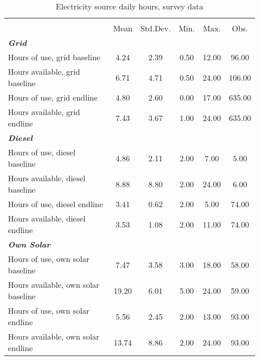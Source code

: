 \begin{table}[htbp]\centering
\def\sym#1{\ifmmode^{#1}\else\(^{#1}\)\fi}
\caption{Electricity source daily hours, survey data\label {tab1}}
\begin{tabular}{l*{1}{ccccc}}
\toprule
                    &\multicolumn{5}{c}{}                                            \\
                    &\multicolumn{1}{c}{{Mean}}&\multicolumn{1}{c}{{Std.Dev.}}&\multicolumn{1}{c}{{Min.}}&\multicolumn{1}{c}{{Max.}}&\multicolumn{1}{c}{{Obs.}}\\
\midrule
\textbf{\emph{Grid}}&            &            &            &            &            \\
Hours of use, grid baseline&        4.24&        2.39&        0.50&       12.00&       96.00\\
Hours available, grid baseline&        6.71&        4.71&        0.50&       24.00&      106.00\\
Hours of use, grid endline&        4.80&        2.60&        0.00&       17.00&      635.00\\
Hours available, grid endline&        7.43&        3.67&        1.00&       24.00&      635.00\\
\textbf{\emph{Diesel}}&            &            &            &            &            \\
Hours of use, diesel baseline&        4.86&        2.11&        2.00&        7.00&        5.00\\
Hours available, diesel baseline&        8.88&        8.80&        2.00&       24.00&        6.00\\
Hours of use, diesel endline&        3.41&        0.62&        2.00&        5.00&       74.00\\
Hours available, diesel endline&        3.53&        1.08&        2.00&       11.00&       74.00\\
\textbf{\emph{Own Solar}}&            &            &            &            &            \\
Hours of use, own solar baseline&        7.47&        3.58&        3.00&       18.00&       58.00\\
Hours available, own solar baseline&       19.20&        6.01&        5.00&       24.00&       59.00\\
Hours of use, own solar endline&        5.56&        2.45&        2.00&       13.00&       93.00\\
Hours available, own solar endline&       13.74&        8.86&        2.00&       24.00&       93.00\\

\end{tabular}
\end{table}
